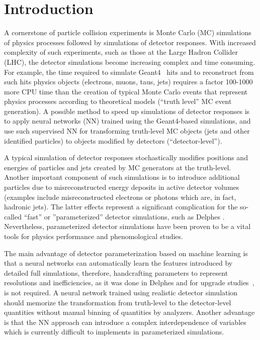 \documentclass[showpacs,showkeys,preprint,prd,nofootinbib,linenumbers,12pt]{revtex4-1}
\begin{document}
\section{Introduction}

A cornerstone of particle collision experiments is Monte Carlo (MC) simulations of physics processes followed by simulations of detector responses. With increased complexity of such experiments, such as those at the Large Hadron Collider (LHC), the detector simulations become increasing complex and time consuming.  For example, the time required to simulate Geant4~\cite{Agostinelli:2002hh} hits and to reconstruct from such hits physics objects (electrons, muons, taus, jets) requires a factor 100-1000 more CPU time than the creation of typical Monte Carlo events that represent physics processes according to theoretical models (``truth level'' MC event generation).  A possible method to speed up simulations of detector responses is to apply neural networks (NN) trained using the Geant4-based simulations, and use such supervised NN for transforming truth-level MC objects (jets and other identified particles) to objects modified by detectors (``detector-level'').  

A typical simulation of detector responses stochastically modifies positions and energies of particles and jets created by MC generators at the truth-level. Another important component of such simulations is to introduce additional particles due to misreconstructed energy deposits in active detector volumes  (examples include misreconstructed electrons or photons which are, in fact, hadronic jets). The latter effects represent a significant complication for the so-called ``fast'' or ''parameterized'' detector simulations, such as Delphes \cite{deFavereau:2013fsa}. Nevertheless, parameterized detector simulations have been proven to be a vital tools for physics performance and phenomological studies.

The main advantage of detector parameterization based on machine learning is that a neural networks can automatically learn the features introduced by detailed full simulations, therefore, handcrafting parameters to represent resolutions and inefficiencies, as it was done in Delphes and for upgrade studies~\cite{truthSmearingFunction}, is not required. A neural network trained using realistic detector simulation should memorize the transformation from truth-level to the detector-level quantities without manual binning of quantities by analyzers. Another advantage is that the NN approach can introduce a complex interdependence of variables which is currently difficult to implements in parameterized simulations. %
\end{document}
